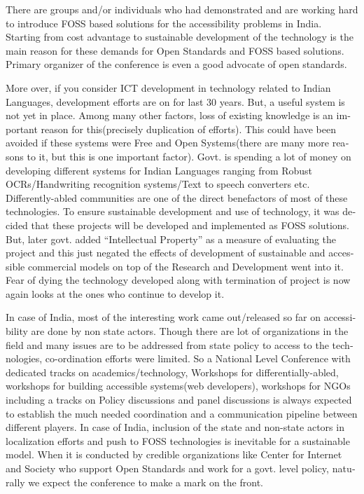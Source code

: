 \begin{english}
There are groups and/or individuals who had demonstrated and are working hard to introduce FOSS based solutions for the accessibility problems in India. Starting from cost advantage to sustainable development of the technology is the main reason for these demands for Open Standards and FOSS based solutions. Primary organizer of the conference is even a good advocate of open standards.

More over, if you consider ICT development in technology related to Indian Languages, development efforts are on for last 30 years. But, a useful system is not yet in place. Among many other factors, loss of existing knowledge is an important reason for this(precisely duplication of efforts). This could have been avoided if these systems were Free and Open Systems(there are many more reasons to it, but this is one important factor). Govt. is spending a lot of money on developing different systems for Indian Languages ranging from Robust OCRs/Handwriting recognition systems/Text to speech converters etc. Differently-abled communities are one of the direct benefactors of most of these technologies. To ensure sustainable development and use of technology, it was decided that these projects will be developed and implemented as FOSS solutions. But, later govt. added “Intellectual Property” as a measure of evaluating the project and this just negated the effects of development of sustainable and accessible commercial models on top of the Research and Development went into it. Fear of dying the technology developed along with termination of project is now again looks at the ones who continue to develop it.

In case of India, most of the interesting work came out/released so far on accessibility are done by non state actors. Though there are lot of organizations in the field and many issues are to be addressed from state policy to access to the technologies, co-ordination efforts were limited. So a National Level Conference with dedicated tracks on academics/technology, Workshops for differentially-abled, workshops for building accessible systems(web developers), workshops for NGOs including a tracks on Policy discussions and panel discussions is always expected to establish the much needed coordination and a communication pipeline between different players. In case of India, inclusion of the state and non-state actors in localization efforts and push to FOSS technologies is inevitable for a sustainable model. When it is conducted by credible organizations like Center for Internet and Society who support Open Standards and work for a govt. level policy, naturally we expect the conference to make a mark on the front.


\end{english}
